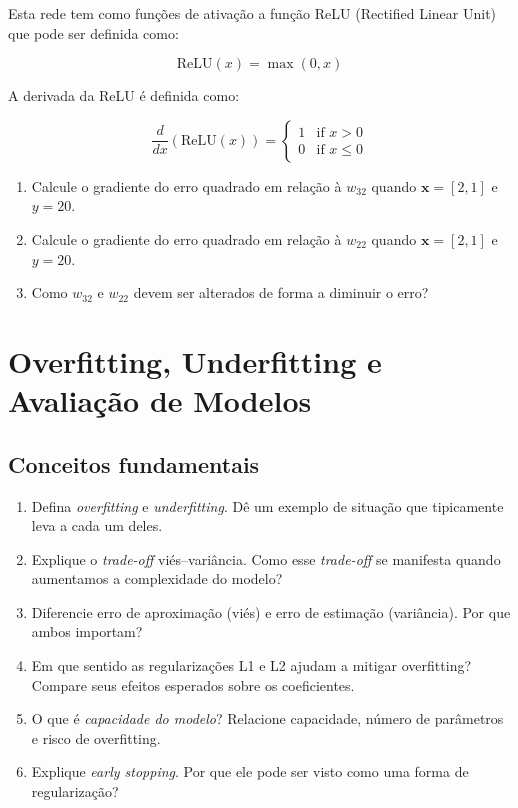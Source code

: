 \documentclass{article}
\begin{document}
\begin{enumerate}
    Esta rede tem como funções de ativação a função ReLU (Rectified Linear Unit) que pode ser definida como:

    \begin{equation}
        \text{ReLU}(x) = \max(0, x)
    \end{equation}

    A derivada da ReLU é definida como:

    \begin{equation}
            \frac{d}{dx}(\text{ReLU}(x)) =
            \begin{cases}
            1 & \text{if } x > 0 \\
            0 & \text{if } x \leq 0
            \end{cases}            
    \end{equation}


    \begin{enumerate}
        \item Calcule o gradiente do erro quadrado em relação à $w_{32}$ quando $\mathbf{x} = [2,1]$ e $y = 20$.
        \item Calcule o gradiente do erro quadrado em relação à $w_{22}$ quando $\mathbf{x} = [2,1]$ e $y = 20$. 
        \item Como $w_{32}$ e $w_{22}$ devem ser alterados de forma a diminuir o erro?   
    \end{enumerate}
      
  \end{enumerate}

  \section{Overfitting, Underfitting e Avaliação de Modelos}

\subsection{Conceitos fundamentais}
\begin{enumerate}
  \item Defina \textit{overfitting} e \textit{underfitting}. Dê um exemplo de situação que tipicamente leva a cada um deles.
  \item Explique o \textit{trade-off} viés–variância. Como esse \textit{trade-off} se manifesta quando aumentamos a complexidade do modelo?
  \item Diferencie erro de aproximação (viés) e erro de estimação (variância). Por que ambos importam?
  \item Em que sentido as regularizações L1 e L2 ajudam a mitigar overfitting? Compare seus efeitos esperados sobre os coeficientes.
  \item O que é \textit{capacidade do modelo}? Relacione capacidade, número de parâmetros e risco de overfitting.
  \item Explique \textit{early stopping}. Por que ele pode ser visto como uma forma de regularização?
\end{enumerate}
\end{document}
